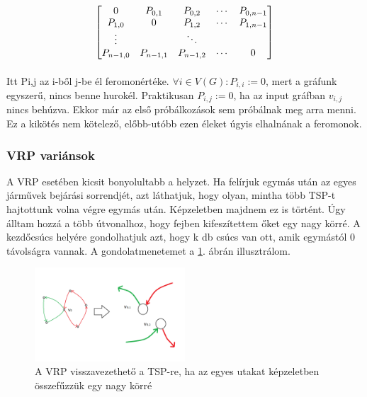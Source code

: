 \begin{equation}
	\centering
	\begin{bmatrix}
		0 & P_{0,1} & P_{0,2} & \cdots & P_{0,n-1}\\ 
		P_{1,0} & 0 & P_{1,2} & \cdots & P_{1,n-1} \\
		\vdots & & \ddots \\
		P_{n-1,0} & P_{n-1,1} & P_{n-1,2} & \cdots & 0
	\end{bmatrix}
\end{equation}



\paragraph{}

Itt P{\scriptsize i,j} az i-ből j-be él feromonértéke. \( \forall i\in V(G) : P_{i,i}:=0 \), mert a gráfunk egyszerű, nincs benne hurokél. Praktikusan \( P_{i,j}:=0 \), ha az input gráfban \(v_{i,j}\) nincs behúzva. Ekkor már az első próbálkozások sem próbálnak meg arra menni. Ez a kikötés nem kötelező, előbb-utóbb ezen éleket úgyis elhalnának a feromonok. 

\subsubsection{VRP variánsok} \label{VRPvariants_subsection}
A VRP esetében kicsit bonyolultabb a helyzet. Ha felírjuk egymás után az egyes járművek bejárási sorrendjét, azt láthatjuk, hogy olyan, mintha több TSP-t hajtottunk volna végre egymás után. Képzeletben majdnem ez is történt. Úgy álltam hozzá a több útvonalhoz, hogy fejben kifeszítettem őket egy nagy körré. A kezdőcsúcs helyére gondolhatjuk azt, hogy k db csúcs van ott, amik egymástól 0 távolságra vannak. A gondolatmenetemet a \ref{tsp-to-vrp}. ábrán illusztrálom. 

\begin{figure}[ht!]
	\centering
	\includegraphics[width=0.5\textwidth]{figures/tsp-to-vrp.png}
	\caption{A VRP visszavezethető a TSP-re, ha az egyes utakat képzeletben összefűzzük egy nagy körré \label{tsp-to-vrp} }
\end{figure}

